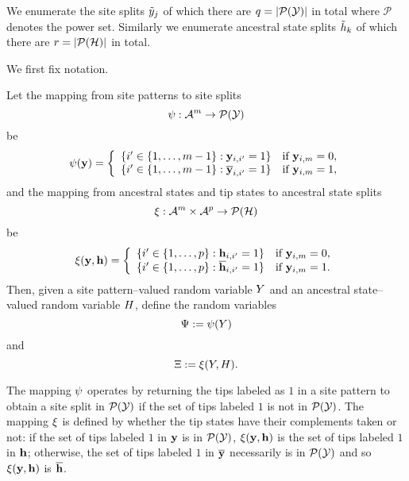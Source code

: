 We enumerate the site splits $\tilde{y}_j$ of which there are $q=|\mathcal{P}(\mathcal{Y})|$ in total where $\mathcal{P}$ denotes the power set.
Similarly we enumerate ancestral state splits $\tilde{h}_k$ of which there are $r=|\mathcal{P}(\mathcal{H})|$ in total.

We first fix notation.
\begin{definition}
Let the mapping from site patterns to site splits
\[
\psi:\mathcal{A}^m\rightarrow\mathcal{P}(\mathcal{Y})
\]
be
\[
\psi(\mathbf{y}) =
\left\{
    \begin{array}{ll}
        \{i'\in\{1,\ldots,m-1\}: \mathbf{y}_{i,i'}=1\}  & \mbox{if } \mathbf{y}_{i,m}=0,\\
        \{i'\in\{1,\ldots,m-1\}: \overline{\mathbf{y}}_{i,i'}=1\}  & \mbox{if } \mathbf{y}_{i,m}=1,
    \end{array}
\right.
\]
and the mapping from ancestral states and tip states to ancestral state splits
\[
\xi:\mathcal{A}^m\times\mathcal{A}^p\rightarrow\mathcal{P}(\mathcal{H})
\]
be
\[
\xi(\mathbf{y}, \mathbf{h}) =
\left\{
    \begin{array}{ll}
        \{i'\in\{1,\ldots,p\}: \mathbf{h}_{i,i'}=1\}  & \mbox{if } \mathbf{y}_{i,m}=0,\\
        \{i'\in\{1,\ldots,p\}: \overline{\mathbf{h}}_{i,i'}=1\}  & \mbox{if } \mathbf{y}_{i,m}=1.
    \end{array}
\right.
\]
Then, given a site pattern--valued random variable $Y$ and an ancestral state--valued random variable $H$, define the random variables
\[
\Psi := \psi(Y)
\]
and
\[
\Xi := \xi(Y, H).
\]
\end{definition}
The mapping $\psi$ operates by returning the tips labeled as $1$ in a site pattern to obtain a site split in $\mathcal{P}(\mathcal{Y})$ if the set of tips labeled $1$ is not in $\mathcal{P}(\mathcal{Y})$.
The mapping $\xi$ is defined by whether the tip states have their complements taken or not: if the set of tips labeled $1$ in $\mathbf{y}$ is in $\mathcal{P}(\mathcal{Y})$, $\xi(\mathbf{y}, \mathbf{h})$ is the set of tips labeled $1$ in $\mathbf{h}$; otherwise, the set of tips labeled $1$ in $\overline{\mathbf{y}}$ necessarily is in $\mathcal{P}(\mathcal{Y})$ and so $\xi(\mathbf{y}, \mathbf{h})$ is $\overline{\mathbf{h}}$.

